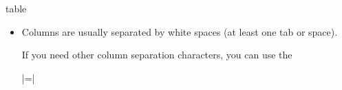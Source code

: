 {\begin{addplotoperation}[]{table}{}
\begin{itemize}
\begin{itemize}
                Alternatively, you can use |row sep=\\| which enables `|\\|' as
                row separator. This might become necessary for inline table
                data, more precisely: if newline characters have been converted
                to white spaces by \TeX's character processing before
                \PGFPlots{} had a chance to see them. This happens if inline
                tables are provided inside of macros. Use |row sep=\\| and
                separate the rows by `|\\|' if you experience such problems.
            \item Columns are usually separated by white spaces (at least
                one tab or space).

                If you need other column separation characters, you can use
                the

                |=|


\end{itemize}
\end{itemize}
\end{addplotoperation}}
